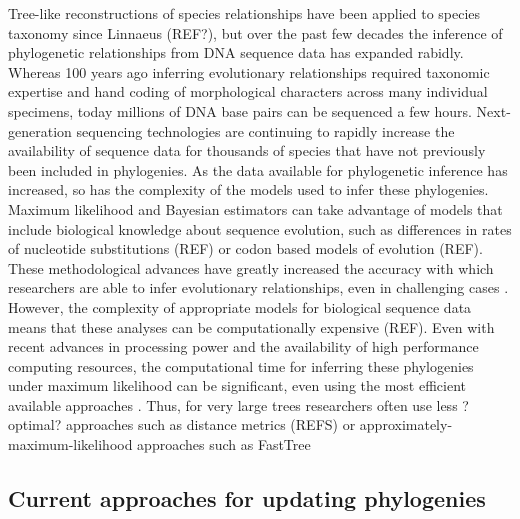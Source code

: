 \documentclass[10pt]{article}
\begin{document}
Tree-like reconstructions of species relationships have been applied to species taxonomy since Linnaeus (REF?), but over the past few decades the inference of phylogenetic relationships from DNA sequence data has expanded rabidly. %
Whereas 100 years ago inferring evolutionary relationships required taxonomic expertise and hand coding of morphological characters across many individual specimens, today millions of DNA base pairs can be sequenced a few hours. Next-generation sequencing technologies are continuing to rapidly increase the availability of sequence data for thousands of species that have not previously been included in phylogenies. As the data available for phylogenetic inference has increased, so has the complexity of the models used to infer these phylogenies. Maximum likelihood and Bayesian estimators can take advantage of models that include biological knowledge about sequence evolution, such as differences in rates of nucleotide substitutions (REF) or codon based models of evolution (REF). These methodological advances have greatly increased the accuracy with which researchers are able to infer evolutionary relationships, even in challenging cases \cite{kuhner_simulation_1994}. However, the complexity of appropriate models for biological sequence data means that these analyses can be computationally expensive (REF). Even with recent advances in processing power and the availability of high performance computing resources, the computational time for inferring these phylogenies under maximum likelihood can be significant, even using the most efficient available approaches \cite{stamatakis_RAxML-VI-HPC:_2006}.  Thus, for very large trees researchers often use less ?optimal? approaches such as distance metrics (REFS) or approximately-maximum-likelihood approaches such as FastTree \cite{price_fasttree:_2009, price_fasttree_2010}


\subsection*{Current approaches for updating phylogenies}
\end{document}
